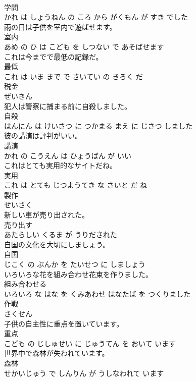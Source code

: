 \documentclass[8pt]{extreport}
\begin{document}
\begin{CJK}{UTF8}{min}
\\	学問 
\\	かれ は しょうねん の ころ から がくもん が すき でした			
\\	雨の日は子供を室内で遊ばせます。	
\\	室内 
\\	あめ の ひ は こども を しつない で あそばせます			
\\	これは今までで最低の記録だ。	
\\	最低 
\\	これ は いま まで で さいてい の きろく だ			
\\	税金	
\\	ぜいきん			
\\	犯人は警察に捕まる前に自殺しました。	
\\	自殺 
\\	はんにん は けいさつ に つかまる まえ に じさつ しました			
\\	彼の講演は評判がいい。	
\\	講演 
\\	かれ の こうえん は ひょうばん が いい			
\\	これはとても実用的なサイトだね。	
\\	実用 
\\	これ は とても じつようてき な さいと だ ね			
\\	製作	
\\	せいさく			
\\	新しい車が売り出された。	
\\	売り出す 
\\	あたらしい くるま が うりだされた			
\\	自国の文化を大切にしましょう。	
\\	自国 
\\	じこく の ぶんか を たいせつ に しましょう			
\\	いろいろな花を組み合わせ花束を作りました。	
\\	組み合わせる 
\\	いろいろ な はな を くみあわせ はなたば を つくりました			
\\	作戦	
\\	さくせん			
\\	子供の自主性に重点を置いています。	
\\	重点 
\\	こども の じしゅせい に じゅうてん を おいて います			
\\	世界中で森林が失われています。	
\\	森林 
\\	せかいじゅう で しんりん が うしなわれて います			

\end{CJK}
\end{document}
